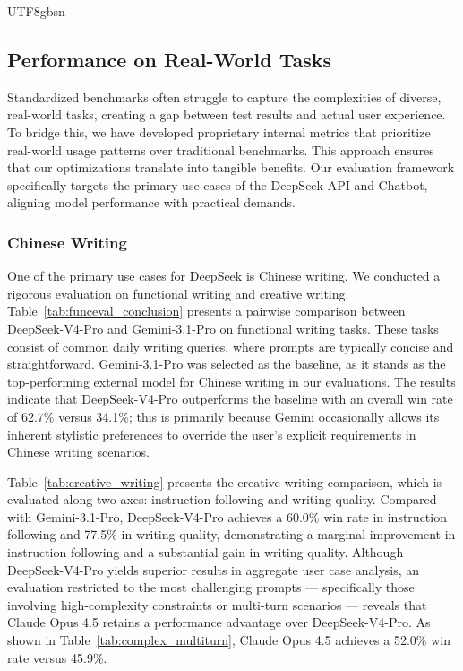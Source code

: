 \documentclass[11pt, a4paper, logo, copyright, nonumbering]{deepseek}
\newcommand{\dsvivp}{DeepSeek-V4-Pro}
\begin{document}
\begin{CJK*}{UTF8}{gbsn}
\subsection{Performance on Real-World Tasks}

Standardized benchmarks often struggle to capture the complexities of diverse, real-world tasks, creating a gap between test results and actual user experience. 
To bridge this, we have developed proprietary internal metrics that prioritize real-world usage patterns over traditional benchmarks. 
This approach ensures that our optimizations translate into tangible benefits. 
Our evaluation framework specifically targets the primary use cases of the DeepSeek API and Chatbot, aligning model performance with practical demands.

\subsubsection{Chinese Writing}

One of the primary use cases for DeepSeek is Chinese writing. 
We conducted a rigorous evaluation on functional writing and creative writing. 
Table~\ref{tab:funceval_conclusion} presents a pairwise comparison between \dsvivp{} and Gemini-3.1-Pro on functional writing tasks. 
These tasks consist of common daily writing queries, where prompts are typically concise and straightforward. 
Gemini-3.1-Pro was selected as the baseline, as it stands as the top-performing external model for Chinese writing in our evaluations. 
The results indicate that \dsvivp{} outperforms the baseline with an overall win rate of 62.7\% versus 34.1\%; this is primarily because Gemini occasionally allows its inherent stylistic preferences to override the user’s explicit requirements in Chinese writing scenarios.

Table~\ref{tab:creative_writing} presents the creative writing comparison, which is evaluated along two axes: instruction following and writing quality. 
Compared with Gemini-3.1-Pro, \dsvivp{} achieves a 60.0\% win rate in instruction following and 77.5\% in writing quality, demonstrating a marginal improvement in instruction following and a substantial gain in writing quality. 
Although \dsvivp{} yields superior results in aggregate user case analysis, an evaluation restricted to the most challenging prompts --- specifically those involving high-complexity constraints or multi-turn scenarios --- reveals that Claude Opus 4.5 retains a performance advantage over \dsvivp{}. 
As shown in Table~\ref{tab:complex_multiturn}, Claude Opus 4.5 achieves a 52.0\% win rate versus 45.9\%.


\end{CJK*}
\end{document}
